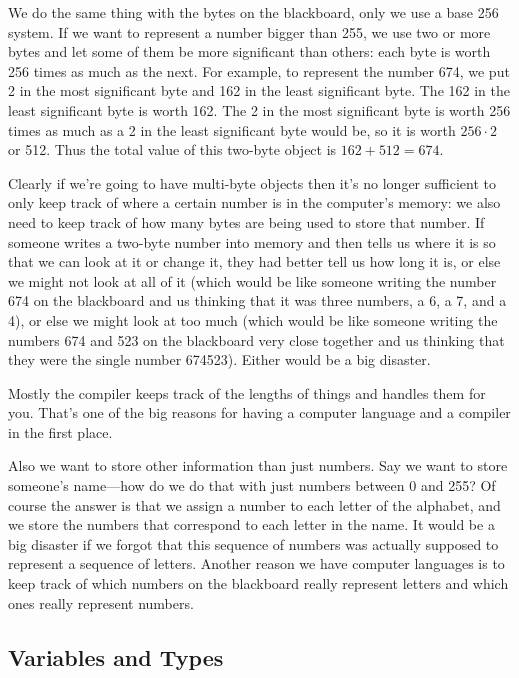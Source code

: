     We do the same thing with the bytes on the blackboard, only we use a
base 256 system.  If we want to represent a number bigger than 255, we
use two or more bytes and let some of them be more significant than
others: each byte is worth 256 times as much as the next.  For example,
to represent the number 674, we put 2 in the most significant byte and
162 in the least significant byte.  The 162 in the least significant
byte is worth 162.  The 2 in the most significant byte is worth 256
times as much as a 2 in the least significant byte would be, so it is
worth $256\cdot 2$ or 512.  Thus the total value of this two-byte object
is $162+512 = 674$.

    Clearly if we're going to have multi-byte objects then it's no
longer sufficient to only keep track of where a certain number is in the
computer's memory: we also need to keep track of how many bytes are
being used to store that number.  If someone writes a two-byte number
into memory and then tells us where it is so that we can look at it or
change it, they had better tell us how long it is, or else we might not
look at all of it (which would be like someone writing the number 674 on
the blackboard and us thinking that it was three numbers, a 6, a 7, and
a 4), or else we might look at too much (which would be like someone
writing the numbers 674 and 523 on the blackboard very close together
and us thinking that they were the single number 674523).  Either would
be a big disaster.

    Mostly the compiler keeps track of the lengths of things and handles
them for you.  That's one of the big reasons for having a computer
language and a compiler in the first place.

    Also we want to store other information than just numbers.  Say we
want to store someone's name---how do we do that with just numbers
between 0 and 255?  Of course the answer is that we assign a number to
each letter of the alphabet, and we store the numbers that correspond to
each letter in the name.  It would be a big disaster if we forgot that
this sequence of numbers was actually supposed to represent a sequence
of letters.  Another reason we have computer languages is to keep track
of which numbers on the blackboard really represent letters and which
ones really represent numbers.

\subsection{Variables and Types}

